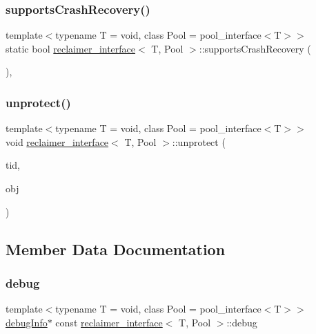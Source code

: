 \subsubsection{\texorpdfstring{supports\+Crash\+Recovery()}{supportsCrashRecovery()}}
{\footnotesize\ttfamily template$<$typename T  = void, class Pool  = pool\+\_\+interface$<$\+T$>$$>$ \\
static bool \hyperlink{classreclaimer__interface}{reclaimer\+\_\+interface}$<$ T, Pool $>$\+::supports\+Crash\+Recovery (\begin{DoxyParamCaption}{ }\end{DoxyParamCaption})\hspace{0.3cm}{\ttfamily [inline]}, {\ttfamily [static]}}

\mbox{\label{classreclaimer__interface_acdeb54332a2edeee70ee37581017ec0b}} 
\subsubsection{\texorpdfstring{unprotect()}{unprotect()}}
{\footnotesize\ttfamily template$<$typename T  = void, class Pool  = pool\+\_\+interface$<$\+T$>$$>$ \\
void \hyperlink{classreclaimer__interface}{reclaimer\+\_\+interface}$<$ T, Pool $>$\+::unprotect (\begin{DoxyParamCaption}\item[{const int}]{tid,  }\item[{T $\ast$}]{obj }\end{DoxyParamCaption})\hspace{0.3cm}{\ttfamily [inline]}}



\subsection{Member Data Documentation}
\mbox{\label{classreclaimer__interface_a617bf5436d7217b303ac65e57709618b}} 
\subsubsection{\texorpdfstring{debug}{debug}}
{\footnotesize\ttfamily template$<$typename T  = void, class Pool  = pool\+\_\+interface$<$\+T$>$$>$ \\
\hyperlink{classdebugInfo}{debug\+Info}$\ast$ const \hyperlink{classreclaimer__interface}{reclaimer\+\_\+interface}$<$ T, Pool $>$\+::debug}

